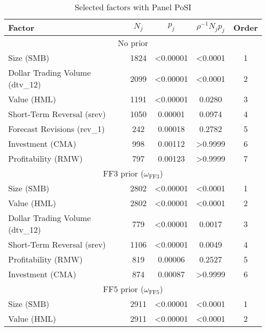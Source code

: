\documentclass[11pt]{article}
\newcommand\tcaptab[1]{\captionsetup{position=top, font=normalsize, labelfont=bf, textfont=normalfont, justification=centering, margin=0mm, aboveskip=1mm, belowskip=0mm, labelsep=colon, singlelinecheck=false}\caption{#1}}
\begin{document}
\begin{table}[t!]
	\tcaptab{Selected factors with Panel PoSI}
	\label{DSHL}
	\centering 
	\begin{tabular}{l|ccc|c}
		\toprule
		Factor  & $N_j$    & $p_j$    & $\rho^{-1} N_jp_j$ & Order \\ \toprule
		\multicolumn{5}{c}{No prior } \\\midrule
		Size (SMB)                      & 1824 & \textless{}0.00001 & \textless{}0.0001    & 1 \\
		Dollar Trading Volume (dtv\_12) & 2099 & \textless{}0.00001 & \textless{}0.0001    & 2 \\
		Value (HML)                     & 1191 & \textless{}0.00001 & 0.0280               & 3 \\
		Short-Term Reversal (srev)      & 1050 & 0.00001            & 0.0974               & 4 \\
		Forecast Revisions (rev\_1)     & 242  & 0.00018            & 0.2782               & 5 \\
		Investment (CMA)                & 998  & 0.00112            & \textgreater{}0.9999 & 6 \\
		Profitability (RMW)             & 797  & 0.00123            & \textgreater{}0.9999 & 7\\\midrule
		\multicolumn{5}{c}{FF3 prior ($\omega_{\text{FF3}}$) } \\\midrule
		Size (SMB)                      & 2802 & \textless{}0.00001 & \textless{}0.0001    & 1 \\
		Value (HML)                     & 2802 & \textless{}0.00001 & \textless{}0.0001    & 2 \\
		Dollar Trading Volume (dtv\_12) & 779  & \textless{}0.00001 & 0.0017               & 3 \\
		Short-Term Reversal (srev)      & 1106 & \textless{}0.00001 & 0.0049               & 4 \\
		Profitability (RMW)             & 819  & 0.00006            & 0.2527               & 5 \\
		Investment (CMA)                & 874  & 0.00087            & \textgreater{}0.9999 & 6\\ \midrule 
		\multicolumn{5}{c}{FF5 prior ($\omega_{\text{FF5}}$) }  \\\midrule
		Size (SMB)                      & 2911 & \textless{}0.00001 & \textless{}0.0001 & 1 \\
		Value (HML)                     & 2911 & \textless{}0.00001 & \textless{}0.0001 & 2 \\

\end{tabular}
\end{table}
\end{document}
